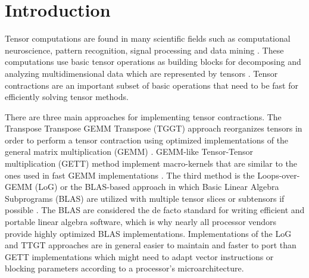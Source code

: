 \section{Introduction}
\label{sec:introduction}
Tensor computations are found in many scientific fields such as computational neuroscience, pattern recognition, signal processing and data mining \citep{karahan:2015:tensor, papalexakis:2017:tensors, song:2019:tensor.completion, rieser:2023:tensor, wang:2023:tensor.decomposition}.
These computations use basic tensor operations as building blocks for decomposing and analyzing multidimensional data which are represented by tensors \citep{lee:2018:fundamental, kolda:2009:decompositions}. 
Tensor contractions are an important subset of basic operations that need to be fast for efficiently solving tensor methods.

There are three main approaches for implementing tensor contractions.
The Transpose Transpose GEMM Transpose (TGGT) approach reorganizes tensors in order to perform a tensor contraction using optimized implementations of the general matrix multiplication (GEMM) \citep{bader:2006:algorithm862,solomonik:2013:cyclops}.
GEMM-like Tensor-Tensor multiplication (GETT) method implement macro-kernels that are similar to the ones used in fast GEMM implementations \citep{springer:2018:design, matthews:2018:high}.
The third method is the Loops-over-GEMM (LoG) or the BLAS-based approach in which Basic Linear Algebra Subprograms (BLAS) are utilized with multiple tensor slices or subtensors if possible \citep{dinapoli:2014:towards.efficient.use, li:2015:input, shi:2016:tensor.contraction, bassoy:2019:ttv}.
The BLAS are considered the de facto standard for writing efficient and portable linear algebra software, which is why nearly all processor vendors provide highly optimized BLAS implementations.
Implementations of the LoG and TTGT approaches are in general easier to maintain and faster to port than GETT implementations which might need to adapt vector instructions or blocking parameters according to a processor's microarchitecture.


